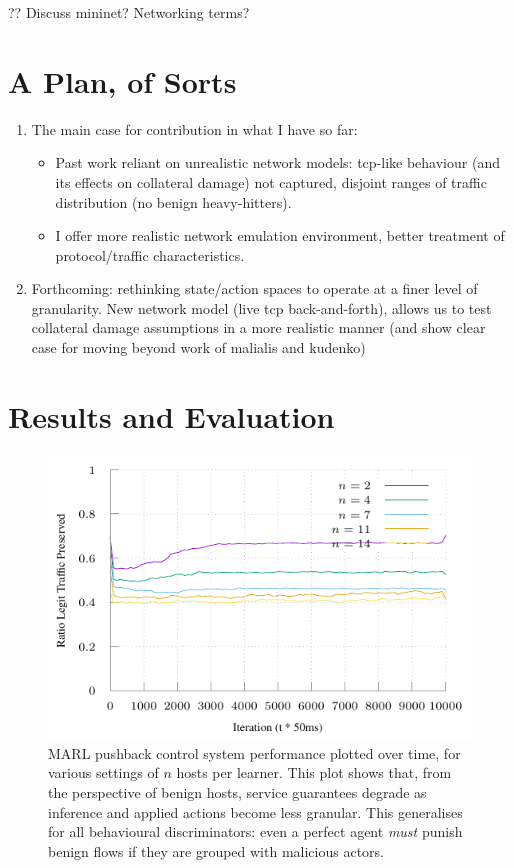 \documentclass[conference, letterpaper, 10pt, times]{IEEEtran}
\begin{document}
?? Discuss mininet? Networking terms?

\section{A Plan, of Sorts}

\begin{enumerate}
	\item The main case for contribution in what I have so far:
	\begin{itemize}
		\item Past work reliant on unrealistic network models: tcp-like behaviour (and its effects on collateral damage) not captured, disjoint ranges of traffic distribution (no benign heavy-hitters).
		\item I offer more realistic network emulation environment, better treatment of protocol/traffic characteristics.
	\end{itemize}
	\item Forthcoming: rethinking state/action spaces to operate at a finer level of granularity. New network model (live tcp back-and-forth), allows us to test collateral damage assumptions in a more realistic manner (and show clear case for moving beyond work of malialis and kudenko)
\end{enumerate}

\section{Results and Evaluation}

\begin{figure}[ht]
	\includegraphics[width=\linewidth]{../plots/online-varyN-uneven}
	\caption{
		MARL pushback control system performance plotted over time, for various settings of $n$ hosts per learner.
		This plot shows that, from the perspective of benign hosts, service guarantees degrade as inference and applied actions become less granular.
		This generalises for all behavioural discriminators: even a perfect agent \emph{must} punish benign flows if they are grouped with malicious actors.
		\label{fig:marl-granularity}
	}
\end{figure}
\end{document}
